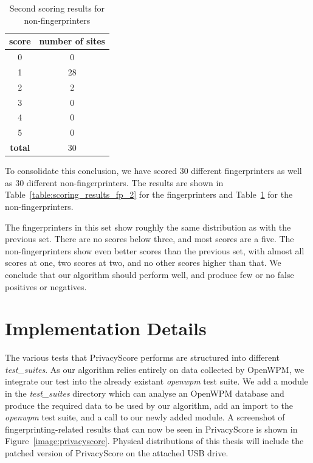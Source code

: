 \documentclass[
    fontsize=12pt,
    headings=small,
    parskip=half,
    bibliography=totoc,
    numbers=noenddot,
    open=any
    ]{scrreprt}
\begin{document}
\begin{table}
\centering
\caption{Second scoring results for non-fingerprinters}
\begin{tabular}{c c}
    \toprule
    \textbf{score} & \textbf{number of sites} \\
    \midrule
    0 & 0 \\
    1 & 28 \\
    2 & 2 \\
    3 & 0 \\
    4 & 0 \\
    5 & 0 \\
    \midrule
    \textbf{total} & 30 \\
    \bottomrule
\end{tabular}
\label{table:scoring_results_nonfp_2}
\end{table}

To consolidate this conclusion, we have scored 30 different fingerprinters
as well as 30 different non-fingerprinters. The results are shown in Table~\ref{table:scoring_results_fp_2}
for the fingerprinters and Table~\ref{table:scoring_results_nonfp_2} for the non-fingerprinters.

The fingerprinters in this set show roughly the same distribution as with the previous set. There are no
scores below three, and most scores are a five. The non-fingerprinters show even better scores than
the previous set, with almost all scores at one, two scores at two, and no other scores higher
than that. We conclude that our algorithm should perform well, and produce few or no
false positives or negatives.


\section{Implementation Details}
The various tests that PrivacyScore performs are structured into different \textit{test\_suites}.
As our algorithm relies entirely on data collected by OpenWPM, we integrate our test
into the already existant \textit{openwpm} test suite. We add a module in the \textit{test\_suites}
directory which can analyse an OpenWPM database and produce the required data to be used
by our algorithm, add an import to the \textit{openwpm} test suite, and a call to our newly
added module. A screenshot of fingerprinting-related results that can now be seen in PrivacyScore
is shown in Figure~\ref{image:privacyscore}.
Physical distributions of this thesis will include the patched version of PrivacyScore
on the attached USB drive.
\end{document}
